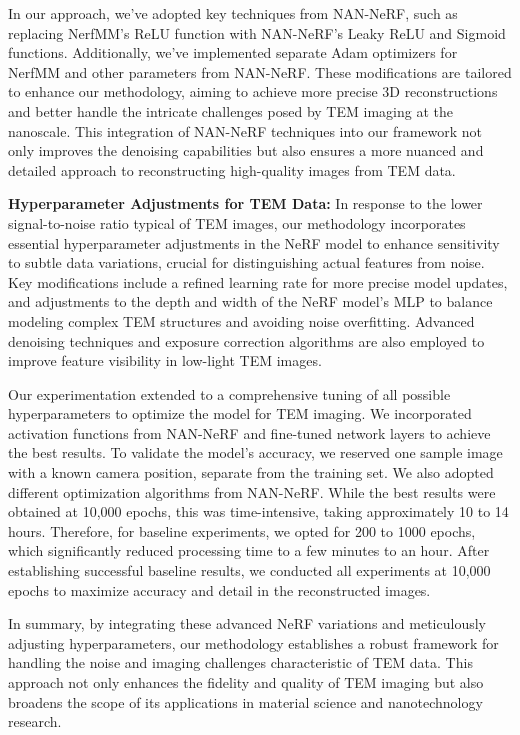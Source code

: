 \vspace{10pt}
In our approach, we've adopted key techniques from NAN-NeRF, such as replacing NerfMM's ReLU function with NAN-NeRF's Leaky ReLU and Sigmoid functions. Additionally, we've implemented separate Adam optimizers for NerfMM and other parameters from NAN-NeRF. These modifications are tailored to enhance our methodology, aiming to achieve more precise 3D reconstructions and better handle the intricate challenges posed by TEM imaging at the nanoscale. This integration of NAN-NeRF techniques into our framework not only improves the denoising capabilities but also ensures a more nuanced and detailed approach to reconstructing high-quality images from TEM data.

\vspace{10pt}

\textbf{Hyperparameter Adjustments for TEM Data:} 
In response to the lower signal-to-noise ratio typical of TEM images, our methodology incorporates essential hyperparameter adjustments in the NeRF model to enhance sensitivity to subtle data variations, crucial for distinguishing actual features from noise. Key modifications include a refined learning rate for more precise model updates, and adjustments to the depth and width of the NeRF model's MLP to balance modeling complex TEM structures and avoiding noise overfitting. Advanced denoising techniques and exposure correction algorithms are also employed to improve feature visibility in low-light TEM images.

\vspace{10pt}
Our experimentation extended to a comprehensive tuning of all possible hyperparameters to optimize the model for TEM imaging. We incorporated activation functions from NAN-NeRF and fine-tuned network layers to achieve the best results. To validate the model's accuracy, we reserved one sample image with a known camera position, separate from the training set. We also adopted different optimization algorithms from NAN-NeRF. While the best results were obtained at 10,000 epochs, this was time-intensive, taking approximately 10 to 14 hours. Therefore, for baseline experiments, we opted for 200 to 1000 epochs, which significantly reduced processing time to a few minutes to an hour. After establishing successful baseline results, we conducted all experiments at 10,000 epochs to maximize accuracy and detail in the reconstructed images.


\vspace{10pt}

In summary, by integrating these advanced NeRF variations and meticulously adjusting hyperparameters, our methodology establishes a robust framework for handling the noise and imaging challenges characteristic of TEM data. This approach not only enhances the fidelity and quality of TEM imaging but also broadens the scope of its applications in material science and nanotechnology research.


